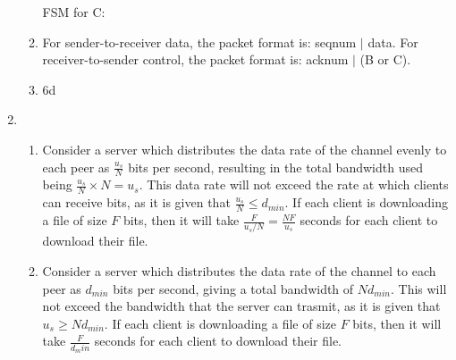 \documentclass{article}
\begin{document}
\begin{enumerate}
\begin{enumerate}

FSM for C:

\item For sender-to-receiver data, the packet format is: seqnum $\vert$ data. For receiver-to-sender control, the packet format is: acknum $\vert$ (B or C).
\item 6d
\end{enumerate}

\item
\begin{enumerate}
\item Consider a server which distributes the data rate of the channel evenly to each peer as $ \frac{u_s}{N} $ bits per second, resulting in the total bandwidth used being $ \frac{u_s}{N} \times N = u_s $. This data rate will not exceed the rate at which clients can receive bits, as it is given that $ \frac{u_s}{N} \leq d_{min} $. If each client is downloading a file of size $ F $ bits, then it will take $ \frac{F}{u_s/N} = \frac{NF}{u_s} $ seconds for each client to download their file.
\item Consider a server which distributes the data rate of the channel to each peer as $ d_{min} $ bits per second, giving a total bandwidth of $ Nd_{min} $. This will not exceed the bandwidth that the server can trasmit, as it is given that $ u_s \geq Nd_{min} $. If each client is downloading a file of size $ F $ bits, then it will take $ \frac{F}{d_min} $ seconds for each client to download their file.
\end{enumerate}

\end{enumerate}
\end{document}
